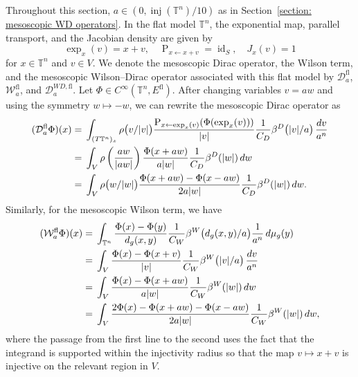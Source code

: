 \documentclass[a4paper,oneside,12pt]{amsart}
\theoremstyle{plain}
\theoremstyle{definition}
\theoremstyle{remark}
\DeclarePairedDelimiter{\abs}{\lvert}{\rvert}
\DeclareMathOperator{\id}{id}
\DeclareMathOperator{\injectivityradius}{inj}
\newcommand{\dvol}{d\mu}
\newcommand{\paralleltransport}[2]{\operatorname{P}_{#2 \gets #1}}
\newcommand{\flattorus}{\mathbb{T}^n}
\newcommand{\cliffordmultiplication}{\rho}
\newcommand{\mesoscopicDiracoperator}[1][a]{\mathcal{D}_{#1}}
\newcommand{\mesoscopicWilsonterm}[1][a]{\mathcal{W}_{#1}}
\newcommand{\cutoff}{\beta}
\newcommand{\cutoffDirac}{\cutoff^D}
\newcommand{\cutoffWilson}{\cutoff^W}
\newcommand{\flatmesoscopicDiracoperator}{\mesoscopicDiracoperator^{\mathrm{fl}}}
\newcommand{\flatmesoscopicWilsonterm}{\mesoscopicWilsonterm^{\mathrm{fl}}}
\newcommand{\flatmesoscopicWilsonDiracoperator}[1][a]{\mathcal{D}_{#1}^{\mathit{WD},\mathrm{fl}}}
\newcommand{\flatmodel}[1]{#1^{\mathrm{fl}}}
\begin{document}
Throughout this section, $a \in (0,\injectivityradius(\flattorus)/10)$ as in Section~\ref{section: mesoscopic WD operators}.
In the flat model $\flattorus$, the exponential map, parallel transport, and the Jacobian density are given by
\begin{equation}
  \exp_x(v) = x + v, \quad \paralleltransport{x+v}{x} = \id_S, \quad J_x(v) = 1
\end{equation}
for $x \in \flattorus$ and $v \in V$.
We denote the mesoscopic Dirac operator, the Wilson term, and the mesoscopic Wilson--Dirac operator associated with this flat model by $\flatmesoscopicDiracoperator$, $\flatmesoscopicWilsonterm$, and $\flatmesoscopicWilsonDiracoperator$.
Let $\Phi \in C^{\infty}(\flattorus,\flatmodel{E})$.
After changing variables $v = aw$ and using the symmetry $w \mapsto -w$, we can rewrite the mesoscopic Dirac operator as
\begin{equation}
  \begin{aligned}
  (\flatmesoscopicDiracoperator \Phi)(x) ={}& \int_{(T\flattorus)_x} \cliffordmultiplication\big(v/\abs{v}\big) \frac{\paralleltransport{\exp_x(v)}{x}(\Phi(\exp_x(v)))}{\abs{v}} \frac{1}{C_D} \cutoffDirac\big(\abs{v}/a\big)\,\frac{dv}{a^n} \\
   ={}& \int_V \cliffordmultiplication\left(\frac{aw}{\abs{aw}}\right) \frac{\Phi(x+aw)}{a\abs{w}} \frac{1}{C_D} \cutoffDirac(\abs{w}) \,dw \\
   ={}& \int_V \cliffordmultiplication\big(w/\abs{w}\big) \frac{\Phi(x+aw) - \Phi(x-aw)}{2a\abs{w}} \frac{1}{C_D} \cutoffDirac(\abs{w}) \,dw.
  \end{aligned}
\end{equation}
Similarly, for the mesoscopic Wilson term, we have
\begin{equation}
  \begin{aligned}
  (\flatmesoscopicWilsonterm \Phi)(x) ={}& \int_{\flattorus} \frac{\Phi(x) - \Phi(y)}{d_g(x,y)} \frac{1}{C_W} \cutoffWilson\big(d_g(x,y)/a\big) \frac{1}{a^n} \,\dvol_g(y) \\
  ={}& \int_V \frac{\Phi(x) - \Phi(x+v)}{\abs{v}} \frac{1}{C_W} \cutoffWilson\big(\abs{v}/a\big) \,\frac{dv}{a^n} \\
  ={}& \int_V \frac{\Phi(x) - \Phi(x+aw)}{a\abs{w}} \frac{1}{C_W} \cutoffWilson(\abs{w}) \,dw \\
  ={}& \int_V \frac{2\Phi(x) - \Phi(x+aw) - \Phi(x-aw)}{2a\abs{w}} \frac{1}{C_W} \cutoffWilson(\abs{w}) \,dw,
  \end{aligned}
\end{equation}
where the passage from the first line to the second uses the fact that the integrand is supported within the injectivity radius so that the map $v \mapsto x+v$ is injective on the relevant region in $V$.
\end{document}
